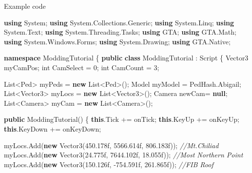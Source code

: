 \documentclass[
  openany]{book}
\newenvironment{Shaded}{\begin{snugshade}}{\end{snugshade}}
\newcommand{\CommentTok}[1]{\textcolor[rgb]{0.56,0.35,0.01}{\textit{#1}}}
\newcommand{\DataTypeTok}[1]{\textcolor[rgb]{0.13,0.29,0.53}{#1}}
\newcommand{\DecValTok}[1]{\textcolor[rgb]{0.00,0.00,0.81}{#1}}
\newcommand{\FloatTok}[1]{\textcolor[rgb]{0.00,0.00,0.81}{#1}}
\newcommand{\FunctionTok}[1]{\textcolor[rgb]{0.00,0.00,0.00}{#1}}
\newcommand{\KeywordTok}[1]{\textcolor[rgb]{0.13,0.29,0.53}{\textbf{#1}}}
\newcommand{\NormalTok}[1]{#1}
\begin{document}
Example code

\begin{Shaded}
\begin{Highlighting}[]
\KeywordTok{using}\NormalTok{ System;}
\KeywordTok{using}\NormalTok{ System.}\FunctionTok{Collections}\NormalTok{.}\FunctionTok{Generic}\NormalTok{;}
\KeywordTok{using}\NormalTok{ System.}\FunctionTok{Linq}\NormalTok{;}
\KeywordTok{using}\NormalTok{ System.}\FunctionTok{Text}\NormalTok{;}
\KeywordTok{using}\NormalTok{ System.}\FunctionTok{Threading}\NormalTok{.}\FunctionTok{Tasks}\NormalTok{;}
\KeywordTok{using}\NormalTok{ GTA;}
\KeywordTok{using}\NormalTok{ GTA.}\FunctionTok{Math}\NormalTok{;}
\KeywordTok{using}\NormalTok{ System.}\FunctionTok{Windows}\NormalTok{.}\FunctionTok{Forms}\NormalTok{;}
\KeywordTok{using}\NormalTok{ System.}\FunctionTok{Drawing}\NormalTok{;}
\KeywordTok{using}\NormalTok{ GTA.}\FunctionTok{Native}\NormalTok{;}

\KeywordTok{namespace}\NormalTok{ ModdingTutorial}
\NormalTok{\{}
    \KeywordTok{public} \KeywordTok{class}\NormalTok{ ModdingTutorial : Script    }
\NormalTok{    \{}
\NormalTok{        Vector3 myCamPos;}
        \DataTypeTok{int}\NormalTok{ CamSelect = }\DecValTok{0}\NormalTok{;}
        \DataTypeTok{int}\NormalTok{ CamCount = }\DecValTok{3}\NormalTok{;}

\NormalTok{        List<Ped> myPeds = }\KeywordTok{new}\NormalTok{ List<Ped>();}
\NormalTok{        Model myModel = PedHash.}\FunctionTok{Abigail}\NormalTok{;}
\NormalTok{        List<Vector3> myLocs = }\KeywordTok{new}\NormalTok{ List<Vector3>();}
\NormalTok{        Camera newCam= }\KeywordTok{null}\NormalTok{;}
\NormalTok{        List<Camera> myCam = }\KeywordTok{new}\NormalTok{ List<Camera>();}

        
        \KeywordTok{public} \FunctionTok{ModdingTutorial}\NormalTok{()}
\NormalTok{        \{}
            \KeywordTok{this}\NormalTok{.}\FunctionTok{Tick}\NormalTok{ += onTick;}
            \KeywordTok{this}\NormalTok{.}\FunctionTok{KeyUp}\NormalTok{ += onKeyUp;}
            \KeywordTok{this}\NormalTok{.}\FunctionTok{KeyDown}\NormalTok{ += onKeyDown;}

\NormalTok{            myLocs.}\FunctionTok{Add}\NormalTok{(}\KeywordTok{new} \FunctionTok{Vector3}\NormalTok{(}\FloatTok{450.178f}\NormalTok{, }\FloatTok{5566.614f}\NormalTok{, }\FloatTok{806.183f}\NormalTok{)); }\CommentTok{//Mt.Chiliad}
\NormalTok{            myLocs.}\FunctionTok{Add}\NormalTok{(}\KeywordTok{new} \FunctionTok{Vector3}\NormalTok{(}\FloatTok{24.775f}\NormalTok{, }\FloatTok{7644.102f}\NormalTok{, }\FloatTok{18.055f}\NormalTok{)); }\CommentTok{//Most Northern Point}
\NormalTok{            myLocs.}\FunctionTok{Add}\NormalTok{(}\KeywordTok{new} \FunctionTok{Vector3}\NormalTok{(}\FloatTok{150.126f}\NormalTok{, }\FloatTok{-754.591f}\NormalTok{, }\FloatTok{261.865f}\NormalTok{)); }\CommentTok{//FIB Roof}


\end{Highlighting}
\end{Shaded}
\end{document}
